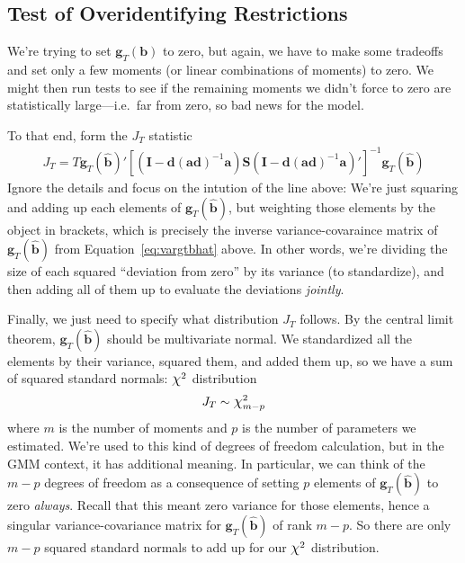 \documentclass[12pt]{article}
\theoremstyle{plain}
\theoremstyle{definition}
\theoremstyle{remark}
\newcommand*{\Chi}{\mbox{\large$\chi$}} %
\begin{document}
\subsection{Test of Overidentifying Restrictions}

We're trying to set $\boldsymbol{g}_T(\boldsymbol{b})$ to zero, but
again, we have to make some tradeoffs and set only a few moments (or
linear combinations of moments) to zero. We might then run tests to see
if the remaining moments we didn't force to zero are statistically
large---i.e.\ far from zero, so bad news for the model.

To that end, form the $J_T$ statistic
\begin{align}
  J_T =
  T
  \boldsymbol{g}_T(\boldsymbol{\hat{b}})'
  \left[
  \left(
    \boldsymbol{I}-\boldsymbol{d}(\boldsymbol{a}\boldsymbol{d})^{-1}
    \boldsymbol{a}
  \right)
  \boldsymbol{S}
  \left(
    \boldsymbol{I}-\boldsymbol{d}(\boldsymbol{a}\boldsymbol{d})^{-1}
    \boldsymbol{a}
  \right)'
  \right]^{-1}
  \boldsymbol{g}_T(\boldsymbol{\hat{b}})
  \label{eq:jtest}
\end{align}
Ignore the details and focus on the intution of the line above: We're
just squaring and adding up each elements of
$\boldsymbol{g}_T(\boldsymbol{\hat{b}})$, but weighting those elements
by the object in brackets, which is precisely the inverse
variance-covaraince matrix of $\boldsymbol{g}_T(\boldsymbol{\hat{b}})$
from Equation~\ref{eq:vargtbhat} above.  In other words, we're dividing
the size of each squared ``deviation from zero'' by its variance (to
standardize), and then adding all of them up to evaluate the deviations
\emph{jointly}.

Finally, we just need to specify what distribution $J_T$ follows. By the
central limit theorem, $\boldsymbol{g}_T(\boldsymbol{\hat{b}})$ should
be multivariate normal. We standardized all the elements by their
variance, squared them, and added them up, so we have a sum of squared
standard normals: $\Chi^2$ distribution
\begin{align*}
  J_T \sim \Chi^2_{m-p}
\end{align*}
where $m$ is the number of moments and $p$ is the number of parameters
we estimated. We're used to this kind of degrees of freedom calculation,
but in the GMM context, it has additional meaning. In particular, we can
think of the $m-p$ degrees of freedom as a consequence of setting $p$
elements of $\boldsymbol{g}_T(\boldsymbol{\hat{b}})$ to zero
\emph{always}. Recall that this meant zero variance for those elements,
hence a singular variance-covariance matrix for
$\boldsymbol{g}_T(\boldsymbol{\hat{b}})$ of rank $m-p$. So there are
only $m-p$ squared standard normals to add up for our $\Chi^2$
distribution.
\end{document}
